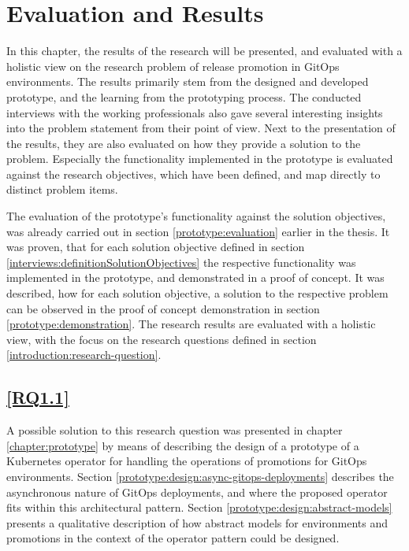 \chapter{Evaluation and Results}
\label{evaluation-and-results}

In this chapter,
the results of the research will be presented,
and evaluated with a holistic view on the research problem of release promotion in GitOps environments.
The results primarily stem from the designed and developed prototype,
and the learning from the prototyping process.
The conducted interviews with the working professionals also gave several interesting insights into
the problem statement from their point of view.
Next to the presentation of the results, they are also evaluated on how they provide a solution
to the problem.
Especially the functionality implemented in the prototype is evaluated against the research objectives,
which have been defined, and map directly to distinct problem items.

The evaluation of the prototype's functionality against the solution objectives,
was already carried out in section \ref{prototype:evaluation} earlier in the thesis.
It was proven, that for each solution objective defined in section \ref{interviews:definitionSolutionObjectives}
the respective functionality was implemented in the prototype,
and demonstrated in a proof of concept.
It was described, how for each solution objective,
a solution to the respective problem can be observed in the
proof of concept demonstration in section \ref{prototype:demonstration}.
The research results are evaluated with a holistic view,
with the focus on the research questions defined in section \ref{introduction:research-question}.

\section*{\ref{RQ1.1}}

A possible solution to this research question was presented in chapter
\ref{chapter:prototype}
by means of describing the design of a prototype
of a Kubernetes operator for handling the operations of promotions for GitOps environments.
%
Section \ref{prototype:design:async-gitops-deployments} describes the asynchronous nature of
GitOps deployments, and where the proposed operator fits within this architectural pattern.
%
Section \ref{prototype:design:abstract-models} presents a qualitative description 
of how abstract models for environments and promotions in the context of the operator pattern
could be designed.

